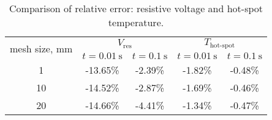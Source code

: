  \begin{table}[H]
    \caption{Comparison of relative error: resistive voltage and hot-spot temperature.} 
    \vspace{-1.em} 
    \fontsize{10}{10}
    \selectfont 
    \renewcommand{\arraystretch}{1.5}
    \begin{center}
        \begin{tabular}{ | c | cc | cc | }  
        \hline
        \multirow{2}{*}{mesh size, mm} & \multicolumn{2}{c|}{$V_\text{res}$} & \multicolumn{2}{c|}{$T_\text{hot-spot}$} \\ 
           & $t=0.01~\text{s}$ & $t=0.1~\text{s}$ & $t=0.01~\text{s}$ & $t=0.1~\text{s}$ \\
        \hline
        1 & -13.65\% & -2.39\% & -1.82\% & -0.48\% \\
        10 & -14.52\% & -2.87\% & -1.69\% & -0.46\% \\
        20 & -14.66\% & -4.41\% & -1.34\% & -0.47\% \\
        \hline 
        \end{tabular}
    \end{center}  
     \label{table: 1d_qv_benchmarking_no_insulation_res_and_hot_spot_error_conclusion} 
 \end{table}